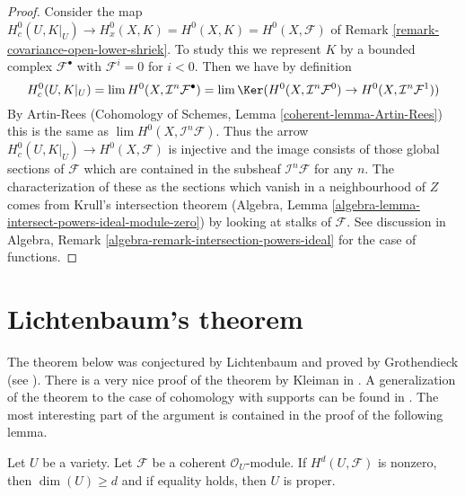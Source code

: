 \begin{proof}
Consider the map
$H^0_c(U, K|_U) \to H^0_x(X, K) = H^0(X, K) = H^0(X, \mathcal{F})$ of
Remark \ref{remark-covariance-open-lower-shriek}. To study this
we represent $K$ by a bounded complex $\mathcal{F}^\bullet$ with
$\mathcal{F}^i = 0$ for $i < 0$. Then we have by definition
$$
H^0_c(U, K|_U) = \lim H^0(X, \mathcal{I}^n\mathcal{F}^\bullet)
= \lim \Ker(
H^0(X, \mathcal{I}^n\mathcal{F}^0) \to
H^0(X, \mathcal{I}^n\mathcal{F}^1))
$$
By Artin-Rees (Cohomology of Schemes, Lemma \ref{coherent-lemma-Artin-Rees})
this is the same as $\lim H^0(X, \mathcal{I}^n\mathcal{F})$.
Thus the arrow $H^0_c(U, K|_U) \to H^0(X, \mathcal{F})$
is injective and the image consists of those global sections of $\mathcal{F}$
which are contained in the subsheaf $\mathcal{I}^n\mathcal{F}$
for any $n$. The characterization of these as the sections which
vanish in a neighbourhood of $Z$ comes from Krull's intersection
theorem (Algebra, Lemma \ref{algebra-lemma-intersect-powers-ideal-module-zero})
by looking at stalks of $\mathcal{F}$. See discussion in
Algebra, Remark \ref{algebra-remark-intersection-powers-ideal}
for the case of functions.
\end{proof}




\section{Lichtenbaum's theorem}
\label{section-lichtenbaum}

\noindent
The theorem below was conjectured by Lichtenbaum and proved by Grothendieck
(see \cite{Hartshorne-local-cohomology}). There is a very nice proof of the
theorem by Kleiman in \cite{Kleiman-Lichtenbaum}. A generalization of
the theorem to the case of cohomology with supports can be found in
\cite{Lyubeznik-Lichtenbaum}. The most interesting part of the argument
is contained in the proof of the following lemma.

\begin{lemma}
\label{lemma-lichtenbaum}
Let $U$ be a variety. Let $\mathcal{F}$ be a coherent $\mathcal{O}_U$-module.
If $H^d(U, \mathcal{F})$ is nonzero, then $\dim(U) \geq d$ and if
equality holds, then $U$ is proper.
\end{lemma}

